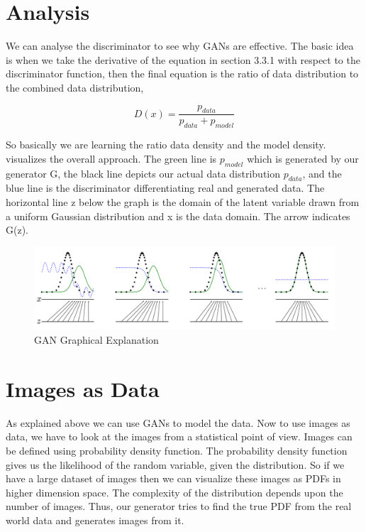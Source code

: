 \section{Analysis}

We can analyse the discriminator to see why GANs are effective. The basic idea is when we take the derivative of the equation in section 3.3.1 with respect to the discriminator function, then the final equation is the ratio of data distribution to the combined data distribution,

$$ D(x) =\frac{p_{data}}{p_{data} + p_{model}}$$

So basically we are learning the ratio data density and the model density.  visualizes the overall approach. The green  line is $p_{model}$ which is generated by our generator G, the black line depicts our actual data distribution $p_{data}$, and the blue line is the discriminator differentiating real and generated data. The horizontal line z below the graph is the domain of the latent variable drawn from a uniform Gaussian %
distribution and x is the data domain. The arrow indicates G(z). 
\begin{figure}[H]
  \centering
    \includegraphics[scale=.4, angle=0]{Files/GAN-Visualize.png}
    \caption[GAN Algorithm Visualization]{ GAN Graphical Explanation \cite{Gan-overview}}
    \label{fig: GAN Graphical Explanation}
\end{figure}

\section{Images as Data}

As explained above we can use GANs to model the data. Now to use images as data, we have to look at the images from a statistical point of view.  Images can be defined using probability density function. The probability density function gives us the likelihood of the random variable, given the distribution. So if we have a large dataset of images then we can visualize these images as PDFs in higher dimension space.
The complexity of the distribution depends upon the number of images. Thus, our generator tries to find the true PDF from the real world data and generates images from it.
